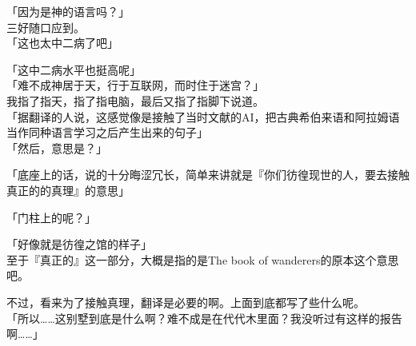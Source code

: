 「因为是神的语言吗？」\\

三好随口应到。\\

「这也太中二病了吧」

「这中二病水平也挺高呢」\\

「难不成神居于天，行于互联网，而时住于迷宫？」\\

我指了指天，指了指电脑，最后又指了指脚下说道。\\

「据翻译的人说，这感觉像是接触了当时文献的AI，把古典希伯来语和阿拉姆语当作同种语言学习之后产生出来的句子」\\

「然后，意思是？」

「底座上的话，说的十分晦涩冗长，简单来讲就是『你们彷徨现世的人，要去接触真正的的真理』的意思」

「门柱上的呢？」

「好像就是彷徨之馆的样子」\\

至于『真正的』这一部分，大概是指的是The book of wanderers的原本这个意思吧。

不过，看来为了接触真理，翻译是必要的啊。上面到底都写了些什么呢。\\

「所以……这别墅到底是什么啊？难不成是在代代木里面？我没听过有这样的报告啊……」\\

